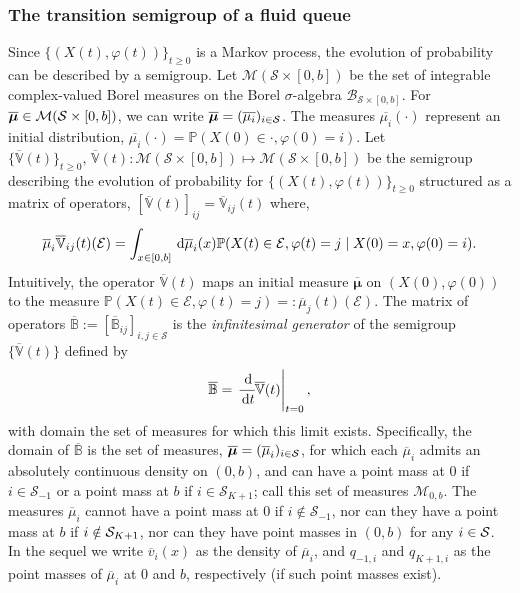 \subsubsection{The transition semigroup of a fluid queue}
Since \(\{( X(t),\varphi(t))\}_{t\geq 0}\) is a Markov process, the evolution of probability can be described by a semigroup. Let $\mathcal{M}(\mathcal{S} \times [0,b])$ be the set of integrable complex-valued Borel measures on the Borel $\sigma$-algebra $\mathcal{B}_{\mathcal{S} \times [0,b]}$. For $\overline{\boldsymbol{\mu}} \in \mathcal{M}(\mathcal{S} \times [0,b])$, we can write \(\overline{\boldsymbol{\mu}} = (\overline{\mu_i})_{i \in \mathcal{S}}\). The measures \(\overline{\mu_i}(\cdot)\) represent an initial distribution, \(\overline{\mu_i}(\cdot) = \mathbb P(X(0)\in\cdot, \varphi(0) = i)\). 
Let \(\{\overline{\mathbb V}(t)\}_{t\geq 0},\, \overline{\mathbb V}(t):\mathcal{M}(\mathcal{S} \times [0,b])\mapsto \mathcal{M}(\mathcal{S} \times [0,b])\) be the semigroup describing the evolution of probability for \(\{(X(t),\varphi(t))\}_{t\geq 0}\) structured as a matrix of operators, \(\left[ \overline{\mathbb V}(t)\right]_{ij}= \overline{\mathbb V}_{ij}(t)\) where, 
\[\overline\mu_i \overline{ \mathbb V}_{ij}(t)(\mathcal{E}) = \int_{x\in[0,b]} \, \mathrm{d} \overline\mu_i(x)\mathbb P (X(t) \in\mathcal{E},\varphi(t) = j \mid X(0) = x, \varphi(0) = i).\]
Intuitively, the operator \( \overline{\mathbb V}(t)\) maps an initial measure \(\overline{\boldsymbol \mu}\) on \((X(0),\varphi(0))\) to the measure \(\mathbb P(X(t)\in \mathcal{E}, \varphi(t)=j)=:\overline\mu_j(t)(\mathcal{E})\). 
The matrix of operators \( \overline{\mathbb B}:=[\overline{\mathbb B}_{ij}]_{i,j\in\mathcal S}\) is the \textit{infinitesimal generator} of the semigroup \(\{ \overline{\mathbb V}(t)\}\) defined by 
\[ \overline{\mathbb B} =\left.\cfrac{\, \mathrm{d}}{\, \mathrm{d} t} \overline{\mathbb V}(t)\right|_{t=0},\]
with domain the set of measures for which this limit exists. Specifically, the domain of \(\overline{\mathbb B}\) is the set of measures, \(\overline{\boldsymbol \mu} = (\overline\mu_i)_{i\in\mathcal{S}}\), for which each \(\overline\mu_i\) admits an absolutely continuous density on \((0,b)\), and can have a point mass at \(0\) if \(i\in\mathcal S_{-1}\) or a point mass at \(b\) if \(i\in\mathcal S_{K+1}\); call this set of measures \(\mathcal M_{0,b}\). The measures \(\overline\mu_i\) cannot have a point mass at 0 if \(i\notin \mathcal S_{-1}\), nor can they have a point mass at \(b\) if \(i\notin\mathcal{S}_{{K+1}}\), nor can they have point masses in \((0,b)\) for any \(i\in\mathcal{S}\). In the sequel we write \(\overline v_i(x)\) as the density of \(\overline\mu_i\), and \(q_{{-1},i}\) and \(q_{{K+1},i}\) as the point masses of \(\overline\mu_i\) at \(0\) and \(b\), respectively (if such point masses exist). 

